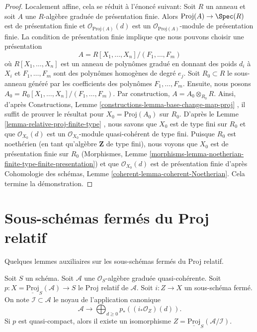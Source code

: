 \begin{proof}
Localement affine, cela se réduit à l'énoncé suivant: Soit  $R$  un anneau
et soit  $A$  une  $R$-algèbre graduée de présentation finie. Alors
 $\text{Proj}(A) \to \Spec(R)$  est de présentation finie et  $\mathcal{O}_{\text{Proj}(A)}(d)$  est un  $\mathcal{O}_{\text{Proj}(A)}$-module
de présentation finie. La condition de présentation finie implique que nous
pouvons choisir une présentation
$$
A = R[X_1, \ldots, X_n]/(F_1, \ldots, F_m)
$$
où  $R[X_1, \ldots, X_n]$  est un anneau de polynômes gradué en donnant des poids  $d_i$ 
à  $X_i$  et  $F_1, \ldots, F_m$  sont des polynômes homogènes de degré  $e_j$.
Soit  $R_0 \subset R$  le sous-anneau généré par les coefficients des polynômes
 $F_1, \ldots, F_m$. Ensuite, nous posons  $A_0 = R_0[X_1, \ldots, X_n]/(F_1, \ldots, F_m)$. Par construction,  $A = A_0 \otimes_{R_0} R$.
Ainsi, d'après Constructions, Lemme  \ref{constructions-lemma-base-change-map-proj} , il suffit de prouver le résultat
pour  $X_0 = \text{Proj}(A_0)$  sur  $R_0$. D'après le Lemme  \ref{lemma-relative-proj-finite-type} , nous savons que
 $X_0$  est de type fini sur  $R_0$  et que  $\mathcal{O}_{X_0}(d)$  est un
 $\mathcal{O}_{X_0}$-module quasi-cohérent de type fini. Puisque  $R_0$  est
noethérien (en tant qu'algèbre  $\mathbf{Z}$ de type fini), nous voyons que
 $X_0$  est de présentation finie sur  $R_0$  (Morphismes, Lemme
 \ref{morphisms-lemma-noetherian-finite-type-finite-presentation}) et que  $\mathcal{O}_{X_0}(d)$  est de présentation finie d'après Cohomologie des
schémas, Lemme  \ref{coherent-lemma-coherent-Noetherian}. Cela termine la démonstration.
\end{proof}










\section{Sous-schémas fermés du Proj relatif}
\label{section-closed-in-relative-proj}

\noindent
Quelques lemmes auxiliaires sur les sous-schémas fermés du Proj relatif.

\begin{lemma}
\label{lemma-closed-subscheme-proj}
Soit  $S$  un schéma. Soit  $\mathcal{A}$  une  $\mathcal{O}_S$-algèbre graduée
quasi-cohérente. Soit  $p : X = \underline{\text{Proj}}_S(\mathcal{A}) \to S$  le Proj relatif de  $\mathcal{A}$. Soit
 $i : Z \to X$  un sous-schéma fermé. On note  $\mathcal{I} \subset \mathcal{A}$  le noyau de l'application
canonique
$$
\mathcal{A}
\longrightarrow
\bigoplus\nolimits_{d \geq 0} p_*\left((i_*\mathcal{O}_Z)(d)\right).
$$
Si  $p$  est quasi-compact, alors il existe un isomorphisme  $Z = \underline{\text{Proj}}_S(\mathcal{A}/\mathcal{I})$.
\end{lemma}

